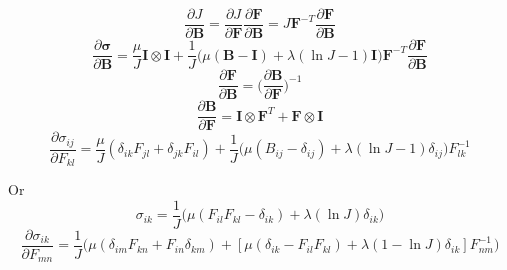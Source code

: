 \documentclass[12pt]{article}
\begin{document}
\begin{equation}
	\frac{\partial J}{\partial \mathbf{B}} = \frac{\partial J}{\partial \mathbf{F}} \frac{\partial \mathbf{F}}{\partial \mathbf{B}} = J \mathbf{F}^{-T} \frac{\partial \mathbf{F}}{\partial \mathbf{B}}
\end{equation}
\begin{equation}
	\frac{\partial \boldsymbol{\sigma}}{\partial \mathbf{B}} = \frac{\mu}{J} \mathbf{I} \otimes \mathbf{I} + \frac{1}{J} \bigg( \mu ( \mathbf{B} - \mathbf{I} ) + \lambda ( \ln J - 1 ) \mathbf{I} \bigg) \mathbf{F}^{-T} \frac{\partial \mathbf{F}}{\partial \mathbf{B}}
\end{equation}
\begin{equation}
	\frac{\partial \mathbf{F}}{\partial \mathbf{B}} = \bigg( \frac{\partial \mathbf{B}}{\partial \mathbf{F}} \bigg)^{-1}
\end{equation}
\begin{equation}
	\frac{\partial \mathbf{B}}{\partial \mathbf{F}} = \mathbf{I} \otimes \mathbf{F}^T + \mathbf{F} \otimes \mathbf{I}
\end{equation}
\begin{equation}
	\frac{\partial \sigma_{ij}}{\partial F_{kl}} = \frac{\mu}{J} (\delta_{ik} F_{jl} + \delta_{jk} F_{il}) + \frac{1}{J} \bigg( \mu ( B_{ij} - \delta_{ij} ) + \lambda ( \ln J - 1 ) \delta_{ij} \bigg) F_{lk}^{-1}
\end{equation}

Or
\begin{equation}
	\sigma_{ik} = \frac{1}{J} \bigg( \mu (F_{il} F_{kl} - \delta_{ik}) + \lambda ( \ln J ) \delta_{ik} \bigg)
\end{equation}
\begin{equation}
	\frac{\partial \sigma_{ik}}{\partial F_{mn}} = \frac{1}{J} \bigg( \mu ( \delta_{im} F_{kn} + F_{in} \delta_{km} ) + \left[ \mu (\delta_{ik} - F_{il} F_{kl}) + \lambda ( 1 - \ln J ) \delta_{ik} \right] F_{nm}^{-1} \bigg)
\end{equation}
\end{document}
